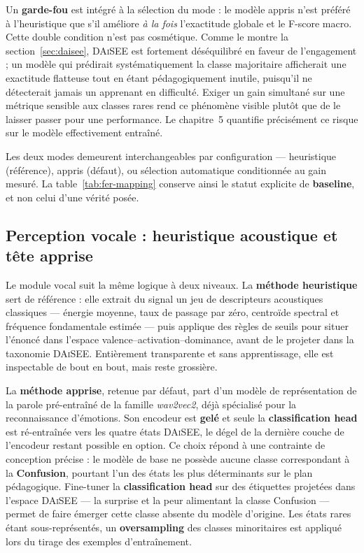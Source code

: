 Un \textbf{garde-fou} est intégré à la sélection du mode : le modèle appris n'est
préféré à l'heuristique que s'il améliore \emph{à la fois} l'exactitude globale et
le F-score macro. Cette double condition n'est pas cosmétique. Comme le montre la
section~\ref{sec:daisee}, \textsc{DAiSEE} est fortement déséquilibré en faveur de
l'engagement ; un modèle qui prédirait systématiquement la classe majoritaire
afficherait une exactitude flatteuse tout en étant pédagogiquement inutile,
puisqu'il ne détecterait jamais un apprenant en difficulté. Exiger un gain
simultané sur une métrique sensible aux classes rares rend ce phénomène visible
plutôt que de le laisser passer pour une performance. Le chapitre~5 quantifie
précisément ce risque sur le modèle effectivement entraîné.

Les deux modes demeurent interchangeables par configuration — heuristique
(référence), appris (défaut), ou sélection automatique conditionnée au gain
mesuré. La table~\ref{tab:fer-mapping} conserve ainsi le statut explicite de
\textbf{baseline}, et non celui d'une vérité posée.

\subsection{Perception vocale : heuristique acoustique et tête apprise}
\label{subsec:ser-appris}

Le module vocal suit la même logique à deux niveaux. La \textbf{méthode
heuristique} sert de référence : elle extrait du signal un jeu de descripteurs
acoustiques classiques — énergie moyenne, taux de passage par zéro, centroïde
spectral et fréquence fondamentale estimée — puis applique des règles de seuils
pour situer l'énoncé dans l'espace valence–activation–dominance, avant de le
projeter dans la taxonomie \textsc{DAiSEE}. Entièrement transparente et sans
apprentissage, elle est inspectable de bout en bout, mais reste grossière.

La \textbf{méthode apprise}, retenue par défaut, part d'un modèle de représentation
de la parole pré-entraîné de la famille \emph{wav2vec2}, déjà spécialisé pour la
reconnaissance d'émotions. Son encodeur est \textbf{gelé} et seule la
\textbf{classification head} est ré-entraînée vers les quatre états
\textsc{DAiSEE}, le dégel de la dernière couche de l'encodeur restant possible en
option. Ce choix répond à une contrainte de conception précise : le modèle de base
ne possède aucune classe correspondant à la \textbf{Confusion}, pourtant l'un des
états les plus déterminants sur le plan pédagogique. Fine-tuner la
\textbf{classification head} sur des étiquettes projetées dans l'espace \textsc{DAiSEE} — la surprise et la peur
alimentant la classe Confusion — permet de faire émerger cette classe absente du
modèle d'origine. Les états rares étant sous-représentés, un \textbf{oversampling}
des classes minoritaires est appliqué lors du tirage des exemples d'entraînement.


